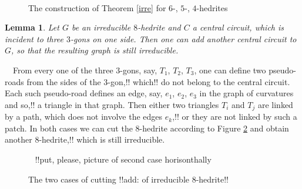 \documentclass[12pt]{article}
\newtheorem{lemma}{Lemma}
\newcommand{\proof}{\noindent{\bf Proof.}\ \ }
\begin{document}

\begin{figure}
\centering
\mbox{\quad
{}\quad
{}}
\caption{The construction of Theorem \ref{irre} for $6$-, $5$-, $4$-hedrites}
\label{The456hedriteCases}
\end{figure}




\begin{lemma}
Let $G$ be an irreducible $8$-hedrite and $C$ a central circuit,
which is incident to three $3$-gons on one side. Then one can add another central circuit to $G$,  so that the resulting graph is still irreducible.
\end{lemma}
\proof From every one of the three $3$-gons, say, $T_1$, $T_2$, $T_3$, one can define two pseudo-roads from the sides of the $3$-gon,!! which!! do not belong to the central circuit.
Each such pseudo-road defines an edge, say, $e_1$, $e_2$, $e_3$ in the graph 
of curvatures and so,!! a triangle in that graph. Then either two triangles 
$T_i$ and $T_j$ are linked by a path, which does not involve 
the edges $e_k$,!!
or they are not linked by such a patch. In both cases we can cut the 
$8$-hedrite according to Figure \ref{TwoCasesCutting} and obtain 
another $8$-hedrite,!! which is still irreducible.


\begin{figure}
\centering
\mbox{
}
!!put, please, picture of second case horisonthally
\caption{The two cases of cutting !!add: of irreducible 
$8$-hedrite!!}
\label{TwoCasesCutting}
\end{figure}





\end{document}
